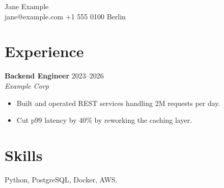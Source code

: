 \documentclass[11pt,a4paper]{article}
\newcommand{\role}[3]{\textbf{#1} \hfill #2 \\ \textit{#3}}
\begin{document}
{\huge Jane Example} \\[2pt]
jane@example.com \textbullet{} +1 555 0100 \textbullet{} Berlin

\section*{Experience}
\role{Backend Engineer}{2023--2026}{Example Corp}
\begin{itemize}
  \item Built and operated REST services handling 2M requests per day.
  \item Cut p99 latency by 40\% by reworking the caching layer.
\end{itemize}

\section*{Skills}
Python, PostgreSQL, Docker, AWS.
\end{document}
